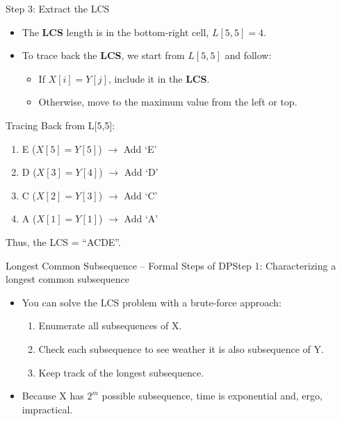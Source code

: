 \documentclass[aspectratio=169]{beamer}
\begin{document}
\begin{frame}{Step 3: Extract the LCS}
    \begin{itemize}
        \item The \textbf{LCS} length is in the bottom-right cell, $L[5,5] = 4$.
        \item To trace back the \textbf{LCS}, we start from $L[5,5]$ and follow:
        \begin{itemize}
            \item If $X[i] = Y[j]$, include it in the \textbf{LCS}.
            \item Otherwise, move to the maximum value from the left or top.
        \end{itemize}
    \end{itemize}

    Tracing Back from L[5,5]:
    \begin{enumerate}
        \item E ($X[5] = Y[5]$) $\longrightarrow$ Add `E'
        \item D ($X[3] = Y[4]$) $\longrightarrow$ Add `D'
        \item C ($X[2] = Y[3]$) $\longrightarrow$ Add `C'
        \item A ($X[1] = Y[1]$) $\longrightarrow$ Add `A'
    \end{enumerate}
    Thus, the LCS = ``ACDE''.
\end{frame}

\begin{frame}{Longest Common Subsequence -- Formal Steps of DP}{Step 1: Characterizing a longest common subsequence}
    \begin{itemize}
        \item You can solve the LCS problem with a brute-force approach:
        \begin{enumerate}
            \item Enumerate all subsequences of X.
            \item Check each subsequence to see weather it is also subsequence of Y.
            \item Keep track of the longest subsequence.
        \end{enumerate}
        \item Because X has $2^m$ possible subsequence, time is exponential and, ergo, impractical.
    \end{itemize}
\end{frame}
\end{document}
